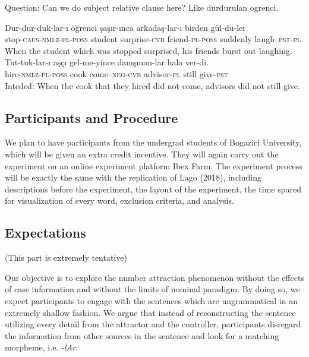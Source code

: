 \documentclass[doc]{apa6}
\begin{document}
Question: Can we do subject relative clause here? Like durdurulan
ogrenci.

\begin{exe}
\ex
\begin{xlist}
\ex \label{fillerreg1}
\gll Dur-dur-duk-lar-{\i} \"{o}\u{g}renci \c{s}a\c{s}{\i}r-{\i}nca arkada\c{s}-lar-{\i} birden g\"{u}l-d\"{u}-ler.\\
stop-\textsc{caus}-\textsc{nmlz}-\textsc{pl}-\textsc{poss} student surprise-\textsc{cvb} friend-\textsc{pl}-\textsc{poss} suddenly laugh--\textsc{pst}-\textsc{pl}\\
\glt When the student which was stopped surprised, his friends burst out laughing.
\ex \label{fillerreg2}
\gll *Tut-tuk-lar-{\i} a\c{s}\c{c}{\i} gel-me-yince dan{\i}\c{s}man-lar hala ver-di.\\
hire-\textsc{nmlz}-\textsc{pl}-\textsc{poss} cook come--\textsc{neg}-\textsc{cvb} advisor-\textsc{pl} still give-\textsc{pst}\\
\glt Inteded: When the cook that they hired did not come, advisors did not still give. 
\end{xlist}
\end{exe}

\subsection{Participants and
Procedure}\label{participants-and-procedure-1}

We plan to have participants from the undergrad students of Bogazici
University, which will be given an extra credit incentive. They will
again carry out the experiment on an online experiment platform Ibex
Farm. The experiment process will be exactly the same with the
replication of Lago (2018), including descriptions before the
experiment, the layout of the experiment, the time spared for
visualization of every word, exclusion criteria, and analysis.

\subsection{Expectations}\label{expectations}

(This part is extremely tentative)

Our objective is to explore the number attraction phenomenon without the
effects of case information and without the limits of nominal paradigm.
By doing so, we expect participants to engage with the sentences which
are ungrammatical in an extremely shallow fashion. We argue that instead
of reconstructing the sentence utilizing every detail from the attractor
and the controller, participants disregard the information from other
sources in the sentence and look for a matching morpheme, i.e.
\emph{-lAr}.
\end{document}
